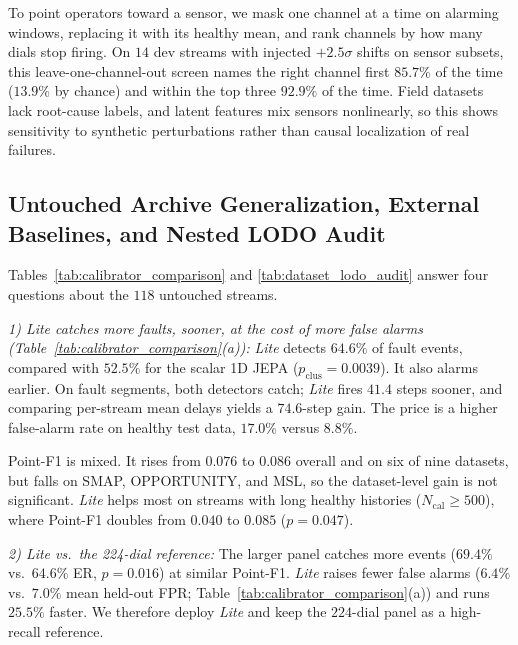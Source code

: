 To point operators toward a sensor, we mask one channel at a time on alarming windows, replacing it with its healthy mean, and rank channels by how many dials stop firing. On $14$ dev streams with injected $+2.5\sigma$ shifts on sensor subsets, this leave-one-channel-out screen names the right channel first $85.7\%$ of the time ($13.9\%$ by chance) and within the top three $92.9\%$ of the time. Field datasets lack root-cause labels, and latent features mix sensors nonlinearly, so this shows sensitivity to synthetic perturbations rather than causal localization of real failures.

\subsection{Untouched Archive Generalization, External Baselines, and Nested LODO Audit}
\label{subsec:calibration_realities}





Tables~\ref{tab:calibrator_comparison} and \ref{tab:dataset_lodo_audit} answer four questions about the $118$ untouched streams.

\noindent\emph{1) Lite catches more faults, sooner, at the cost of more false alarms (Table~\ref{tab:calibrator_comparison}(a)):} \emph{Lite} detects $64.6\%$ of fault events, compared with $52.5\%$ for the scalar 1D JEPA ($p_{\text{clus}}=0.0039$). It also alarms earlier. On fault segments, both detectors catch; \emph{Lite} fires $41.4$ steps sooner, and comparing per-stream mean delays yields a $74.6$-step gain. The price is a higher false-alarm rate on healthy test data, $17.0\%$ versus $8.8\%$.

Point-F1 is mixed. It rises from $0.076$ to $0.086$ overall and on six of nine datasets, but falls on SMAP, OPPORTUNITY, and MSL, so the dataset-level gain is not significant. \emph{Lite} helps most on streams with long healthy histories ($N_{\text{cal}}\ge 500$), where Point-F1 doubles from $0.040$ to $0.085$ ($p=0.047$).

\noindent\emph{2) Lite vs.\ the 224-dial reference:} The larger panel catches more events ($69.4\%$ vs.\ $64.6\%$ ER, $p=0.016$) at similar Point-F1. \emph{Lite} raises fewer false alarms ($6.4\%$ vs.\ $7.0\%$ mean held-out FPR; Table~\ref{tab:calibrator_comparison}(a)) and runs $25.5\%$ faster. We therefore deploy \emph{Lite} and keep the $224$-dial panel as a high-recall reference.

